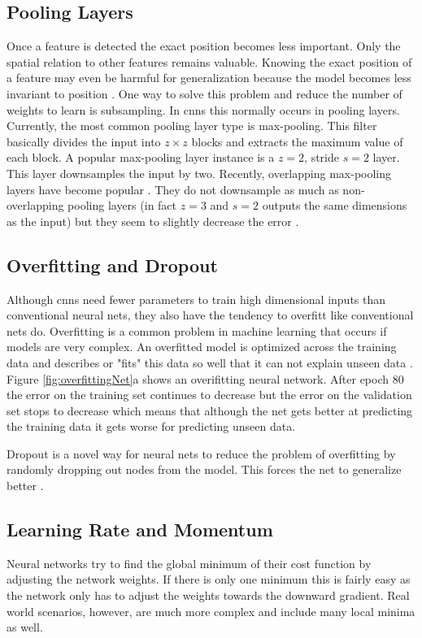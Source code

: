 \subsection*{Pooling Layers}
Once a feature is detected the exact position becomes less important. Only the spatial relation to other features remains valuable. Knowing the exact position of a feature may even be harmful for generalization because the model becomes less invariant to position \cite{LeCun1998}. One way to solve this problem and reduce the number of weights to learn is subsampling. In \glspl{cnn} this normally occurs in pooling layers. Currently, the most common pooling layer type is max-pooling. This filter basically divides the input into $z\times z$ blocks and extracts the maximum value of each block. A popular max-pooling layer instance is a $z=2$, stride $s=2$ layer. This layer downsamples the input by two. Recently, overlapping max-pooling layers have become popular \cite{Szegedy2014}. They do not downsample as much as non-overlapping pooling layers {(in fact $z=3$ and $s=2$ outputs the same dimensions as the input)} but they seem to slightly decrease the error \cite{Krizhevsky2012}.

\subsection*{Overfitting and Dropout}
\label{subsec:overfittingDropout}
Although \glspl{cnn} need fewer parameters to train high dimensional inputs than conventional neural nets, they also have the tendency to overfitt like conventional nets do. Overfitting is a common problem in machine learning that occurs if models are very complex. An overfitted model is optimized across the training data and describes or "fits" this data so well that it can not explain unseen data \cite{Falkenauer1998}. Figure \ref{fig:overfittingNet}a shows an overifitting neural network. After epoch 80 the error on the training set continues to decrease but the error on the validation set stops to decrease which means that although the net gets better at predicting the training data it gets worse for predicting unseen data.

Dropout is a novel way for neural nets to reduce the problem of overfitting by randomly dropping out nodes from the model. This forces the net to generalize better \cite{Srivastava2014}.

\subsection*{Learning Rate and Momentum}
\label{subsec:learningMomentum}
Neural networks try to find the global minimum of their cost function by adjusting the network weights. If there is only one minimum this is fairly easy as the network only has to adjust the weights towards the downward gradient. Real world scenarios, however, are much more complex and include many local minima as well. 

